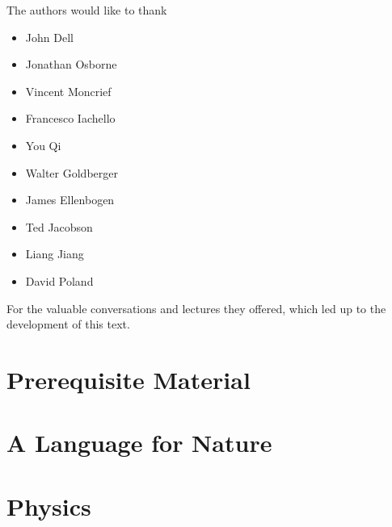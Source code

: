 \documentclass[12pt, twoside, openany]{book}
\newcommand{\1}{\mathbbm{1}}
\theoremstyle{definition}
\begin{document}
\begin{large}
	The authors would like to thank 
	\begin{itemize}
		\item John Dell
		\item Jonathan Osborne
		\item Vincent Moncrief
		\item Francesco Iachello
		\item You Qi
		\item Walter Goldberger
		\item James Ellenbogen
		\item Ted Jacobson
		\item Liang Jiang
		\item David Poland
	\end{itemize}
	For the valuable conversations and lectures they offered, which led up to the development of this text.
\end{large}

\newpage

\setcounter{page}{1}

\part{Prerequisite Material}








\part{A Language for Nature}\thispagestyle{empty}









\part{Physics}\thispagestyle{empty}

\end{document}
